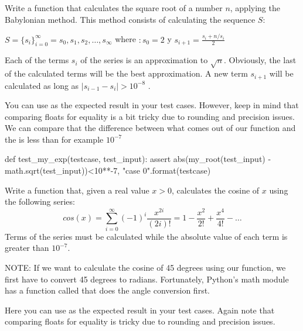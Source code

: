 \begin{exercise}
Write a function  that calculates the square root of a number $n$, applying the Babylonian method. This method consists of calculating the sequence $S$:
\begin{center}
$S = \lbrace s_{i} \rbrace ^{\infty}_{i=0}= s_{0} , s_{1} , s_{2} , \dots , s_{\infty}$ where $: s_{0} = 2 $    y   $ s_{i+1} = \frac {s_{i} + n/s_{i}}{2}$
\end{center}
Each of the terms $s_{i}$ of the series is an approximation to $\sqrt{n}$. Obviously, the last of the calculated terms will be the best approximation. A new term $s_{i+1}$ will be calculated as long as $|s_{i-1} - s_{i} | > 10^{-8}$ .


You can use  as the expected result in your test cases. However, keep in mind that comparing floats for equality is a bit tricky due to rounding and precision issues.
We can compare that the difference between what comes out of our function and the  is less than for example $10^{-7}$

\begin{small}
\begin{python}
def test_my_exp(testcase, test_input):
   assert abs(my_root(test_input) - math.sqrt(test_input))<10**-7, 
          "case {0}".format(testcase)
\end{python}
\end{small}
\end{exercise}



\begin{exercise}
Write a function  that, given a real value $x > 0$, calculates the cosine of $x$ using the following series:
$$cos(x)=\sum_{i=0}^{\infty}(-1)^{i}\frac{x^{2i}}{(2i)!}= 1 - \frac{x^{2}}{2!} + \frac{x^{4}}{4!} - \dots$$
Terms of the series must be calculated while the absolute value of each term is greater than $10^{-7}$.

NOTE: If we want to calculate the cosine of 45 degrees using our  function, we first have to convert 45 degrees to radians. Fortunately, Python's math module has a function called  that does the angle conversion first.

Here you can use  as the expected result in your test cases. Again note that comparing floats for equality is tricky due to rounding and precision issues.
\end{exercise}


